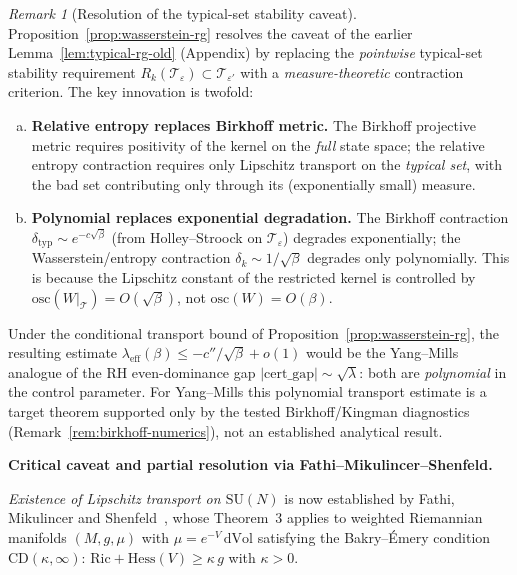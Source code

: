 \documentclass[12pt,a4paper]{article}
\theoremstyle{definition}
\theoremstyle{plain}
\theoremstyle{remark}
\newtheorem{remark}[definition]{Remark}
\begin{document}
\begin{remark}[Resolution of the typical-set stability caveat]\label{rem:wasserstein-rg-significance}
Proposition~\ref{prop:wasserstein-rg} resolves the caveat of the earlier
Lemma~\ref{lem:typical-rg-old} (Appendix) by replacing the
\emph{pointwise} typical-set stability requirement
$R_k(\mathcal{T}_\varepsilon) \subset \mathcal{T}_{\varepsilon'}$
with a \emph{measure-theoretic} contraction criterion.
The key innovation is twofold:
\begin{enumerate}[(a)]
\item \textbf{Relative entropy replaces Birkhoff metric.}
  The Birkhoff projective metric requires positivity of the kernel on the
  \emph{full} state space; the relative entropy contraction requires
  only Lipschitz transport on the \emph{typical set}, with the bad set
  contributing only through its (exponentially small) measure.
\item \textbf{Polynomial replaces exponential degradation.}
  The Birkhoff contraction $\delta_{\mathrm{typ}} \sim e^{-c\sqrt{\beta}}$
  (from Holley--Stroock on $\mathcal{T}_\varepsilon$) degrades exponentially;
  the Wasserstein/entropy contraction $\delta_k \sim 1/\sqrt{\beta}$
  degrades only polynomially.  This is because the Lipschitz constant
  of the restricted kernel is controlled by
  $\mathrm{osc}(W|_{\mathcal{T}}) = O(\sqrt{\beta})$,
  not $\mathrm{osc}(W) = O(\beta)$.
\end{enumerate}
Under the conditional transport bound of Proposition~\ref{prop:wasserstein-rg},
the resulting estimate
$\lambda_{\mathrm{eff}}(\beta) \leq -c''/\sqrt{\beta} + o(1)$
would be the Yang--Mills analogue of the RH even-dominance gap
$|\mathrm{cert\_gap}| \sim \sqrt{\lambda}$: both are \emph{polynomial} in
the control parameter. For Yang--Mills this polynomial transport estimate
is a target theorem supported only by the tested Birkhoff/Kingman diagnostics
(Remark~\ref{rem:birkhoff-numerics}), not an established analytical result.

\textbf{Critical caveat and partial resolution via Fathi--Mikulincer--Shenfeld.}

\emph{Existence of Lipschitz transport on $\mathrm{SU}(N)$} is now
established by Fathi, Mikulincer and Shenfeld~\cite{FathiMikulincerShenfeld2024},
whose Theorem~3 applies to weighted Riemannian manifolds $(M,g,\mu)$ with
$\mu = e^{-V}\,\mathrm{d Vol}$ satisfying the Bakry--\'Emery condition
$\mathrm{CD}(\kappa, \infty)$: $\mathrm{Ric} + \mathrm{Hess}(V) \geq \kappa\,g$
with $\kappa > 0$.


\end{remark}
\end{document}
